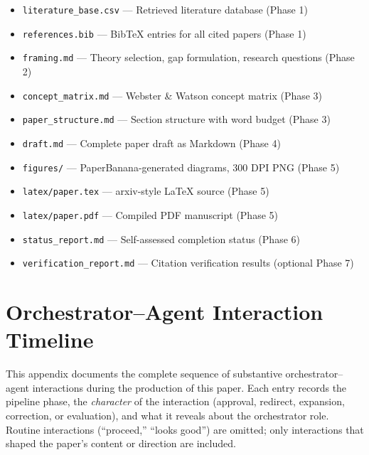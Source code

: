 \begin{itemize}
  \item \texttt{literature\_base.csv} --- Retrieved literature database (Phase 1)
  \item \texttt{references.bib} --- BibTeX entries for all cited papers (Phase 1)
  \item \texttt{framing.md} --- Theory selection, gap formulation, research questions (Phase 2)
  \item \texttt{concept\_matrix.md} --- Webster \& Watson concept matrix (Phase 3)
  \item \texttt{paper\_structure.md} --- Section structure with word budget (Phase 3)
  \item \texttt{draft.md} --- Complete paper draft as Markdown (Phase 4)
  \item \texttt{figures/} --- PaperBanana-generated diagrams, 300 DPI PNG (Phase 5)
  \item \texttt{latex/paper.tex} --- arxiv-style LaTeX source (Phase 5)
  \item \texttt{latex/paper.pdf} --- Compiled PDF manuscript (Phase 5)
  \item \texttt{status\_report.md} --- Self-assessed completion status (Phase 6)
  \item \texttt{verification\_report.md} --- Citation verification results (optional Phase 7)
\end{itemize}


\section{Orchestrator--Agent Interaction Timeline}
\label{app:timeline}

This appendix documents the complete sequence of substantive orchestrator--agent interactions during the production of this paper. Each entry records the pipeline phase, the \textit{character} of the interaction (approval, redirect, expansion, correction, or evaluation), and what it reveals about the orchestrator role. Routine interactions (``proceed,'' ``looks good'') are omitted; only interactions that shaped the paper's content or direction are included.

\vspace{0.5em}

